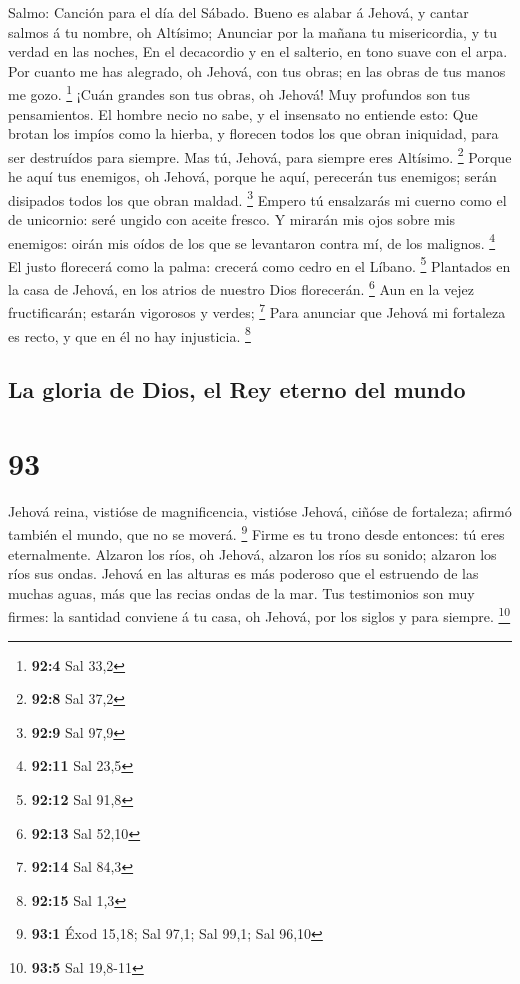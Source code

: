  Salmo: Canción para el día del Sábado. Bueno es alabar á
Jehová, y cantar salmos á tu nombre, oh Altísimo;  Anunciar
por la mañana tu misericordia, y tu verdad en las noches, 
En el decacordio y en el salterio, en tono suave con el arpa.
 Por cuanto me has alegrado, oh Jehová, con tus obras; en
las obras de tus manos me gozo. \footnote{\textbf{92:4} Sal 33,2}
 ¡Cuán grandes son tus obras, oh Jehová! Muy profundos son
tus pensamientos.  El hombre necio no sabe, y el insensato
no entiende esto:  Que brotan los impíos como la hierba, y
florecen todos los que obran iniquidad, para ser destruídos para
siempre.  Mas tú, Jehová, para siempre eres Altísimo.
\footnote{\textbf{92:8} Sal 37,2}  Porque he aquí tus
enemigos, oh Jehová, porque he aquí, perecerán tus enemigos; serán
disipados todos los que obran maldad. \footnote{\textbf{92:9} Sal 97,9}
 Empero tú ensalzarás mi cuerno como el de unicornio: seré
ungido con aceite fresco.  Y mirarán mis ojos sobre mis
enemigos: oirán mis oídos de los que se levantaron contra mí, de los
malignos. \footnote{\textbf{92:11} Sal 23,5}  El justo
florecerá como la palma: crecerá como cedro en el Líbano. \footnote{\textbf{92:12}
  Sal 91,8}  Plantados en la casa de Jehová, en los atrios
de nuestro Dios florecerán. \footnote{\textbf{92:13} Sal 52,10}
 Aun en la vejez fructificarán; estarán vigorosos y verdes;
\footnote{\textbf{92:14} Sal 84,3}  Para anunciar que
Jehová mi fortaleza es recto, y que en él no hay injusticia. \footnote{\textbf{92:15}
  Sal 1,3}

\hypertarget{la-gloria-de-dios-el-rey-eterno-del-mundo}{%
\subsection{La gloria de Dios, el Rey eterno del
mundo}\label{la-gloria-de-dios-el-rey-eterno-del-mundo}}

\hypertarget{section-92}{%
\section{93}\label{section-92}}

 Jehová reina, vistióse de magnificencia, vistióse Jehová,
ciñóse de fortaleza; afirmó también el mundo, que no se moverá.
\footnote{\textbf{93:1} Éxod 15,18; Sal 97,1; Sal 99,1; Sal 96,10}
 Firme es tu trono desde entonces: tú eres eternalmente.
 Alzaron los ríos, oh Jehová, alzaron los ríos su sonido;
alzaron los ríos sus ondas.  Jehová en las alturas es más
poderoso que el estruendo de las muchas aguas, más que las recias ondas
de la mar.  Tus testimonios son muy firmes: la santidad
conviene á tu casa, oh Jehová, por los siglos y para siempre.
\footnote{\textbf{93:5} Sal 19,8-11}


